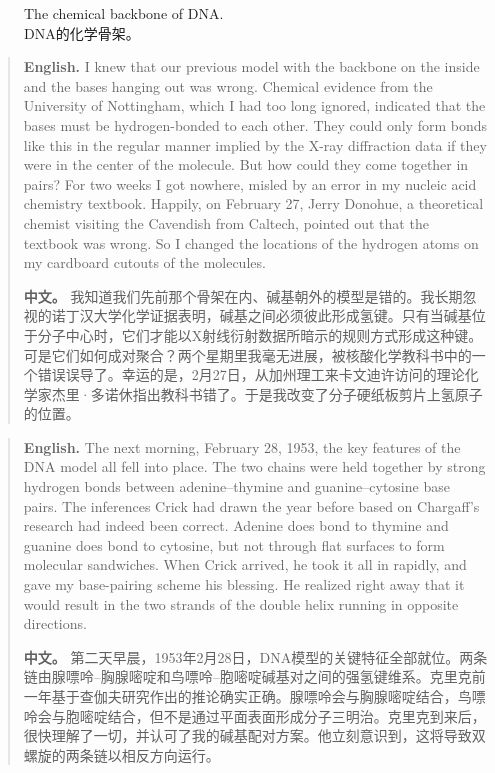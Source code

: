 \begin{figure}[htbp]
\centering
{}
\caption{The chemical backbone of DNA.\\DNA的化学骨架。}
\end{figure}

\begin{quote}
\noindent\textbf{English.} I knew that our previous model with the backbone on the inside and the bases hanging out was wrong. Chemical evidence from the University of Nottingham, which I had too long ignored, indicated that the bases must be hydrogen-bonded to each other. They could only form bonds like this in the regular manner implied by the X-ray diffraction data if they were in the center of the molecule. But how could they come together in pairs? For two weeks I got nowhere, misled by an error in my nucleic acid chemistry textbook. Happily, on February 27, Jerry Donohue, a theoretical chemist visiting the Cavendish from Caltech, pointed out that the textbook was wrong. So I changed the locations of the hydrogen atoms on my cardboard cutouts of the molecules.

\smallskip
\noindent\textbf{中文。} 我知道我们先前那个骨架在内、碱基朝外的模型是错的。我长期忽视的诺丁汉大学化学证据表明，碱基之间必须彼此形成氢键。只有当碱基位于分子中心时，它们才能以X射线衍射数据所暗示的规则方式形成这种键。可是它们如何成对聚合？两个星期里我毫无进展，被核酸化学教科书中的一个错误误导了。幸运的是，2月27日，从加州理工来卡文迪许访问的理论化学家杰里·多诺休指出教科书错了。于是我改变了分子硬纸板剪片上氢原子的位置。
\end{quote}

\begin{quote}
\noindent\textbf{English.} The next morning, February 28, 1953, the key features of the DNA model all fell into place. The two chains were held together by strong hydrogen bonds between adenine--thymine and guanine--cytosine base pairs. The inferences Crick had drawn the year before based on Chargaff's research had indeed been correct. Adenine does bond to thymine and guanine does bond to cytosine, but not through flat surfaces to form molecular sandwiches. When Crick arrived, he took it all in rapidly, and gave my base-pairing scheme his blessing. He realized right away that it would result in the two strands of the double helix running in opposite directions.

\smallskip
\noindent\textbf{中文。} 第二天早晨，1953年2月28日，DNA模型的关键特征全部就位。两条链由腺嘌呤--胸腺嘧啶和鸟嘌呤--胞嘧啶碱基对之间的强氢键维系。克里克前一年基于查伽夫研究作出的推论确实正确。腺嘌呤会与胸腺嘧啶结合，鸟嘌呤会与胞嘧啶结合，但不是通过平面表面形成分子三明治。克里克到来后，很快理解了一切，并认可了我的碱基配对方案。他立刻意识到，这将导致双螺旋的两条链以相反方向运行。
\end{quote}


